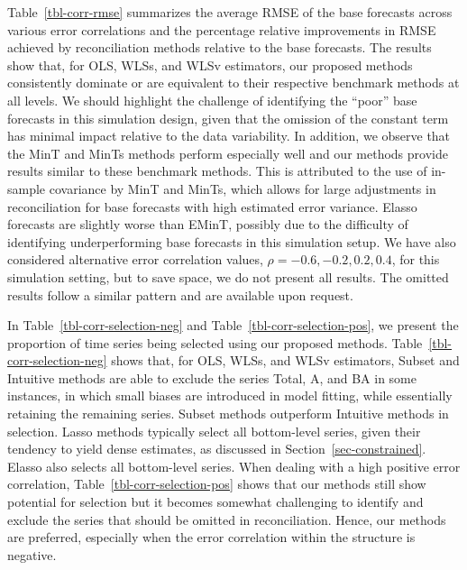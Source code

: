 \documentclass[
  11pt]{article}
\theoremstyle{plain}
\theoremstyle{remark}
\begin{document}
Table~\ref{tbl-corr-rmse} summarizes the average RMSE of the base
forecasts across various error correlations and the percentage relative
improvements in RMSE achieved by reconciliation methods relative to the
base forecasts. The results show that, for OLS, WLSs, and WLSv
estimators, our proposed methods consistently dominate or are equivalent
to their respective benchmark methods at all levels. We should highlight
the challenge of identifying the ``poor'' base forecasts in this
simulation design, given that the omission of the constant term has
minimal impact relative to the data variability. In addition, we observe
that the MinT and MinTs methods perform especially well and our methods
provide results similar to these benchmark methods. This is attributed
to the use of in-sample covariance by MinT and MinTs, which allows for
large adjustments in reconciliation for base forecasts with high
estimated error variance. Elasso forecasts are slightly worse than
EMinT, possibly due to the difficulty of identifying underperforming
base forecasts in this simulation setup. We have also considered
alternative error correlation values, \(\rho = -0.6, -0.2, 0.2, 0.4\),
for this simulation setting, but to save space, we do not present all
results. The omitted results follow a similar pattern and are available
upon request.

In Table~\ref{tbl-corr-selection-neg} and
Table~\ref{tbl-corr-selection-pos}, we present the proportion of time
series being selected using our proposed methods.
Table~\ref{tbl-corr-selection-neg} shows that, for OLS, WLSs, and WLSv
estimators, Subset and Intuitive methods are able to exclude the series
Total, A, and BA in some instances, in which small biases are introduced
in model fitting, while essentially retaining the remaining series.
Subset methods outperform Intuitive methods in selection. Lasso methods
typically select all bottom-level series, given their tendency to yield
dense estimates, as discussed in Section~\ref{sec-constrained}. Elasso
also selects all bottom-level series. When dealing with a high positive
error correlation, Table~\ref{tbl-corr-selection-pos} shows that our
methods still show potential for selection but it becomes somewhat
challenging to identify and exclude the series that should be omitted in
reconciliation. Hence, our methods are preferred, especially when the
error correlation within the structure is negative.
\end{document}
